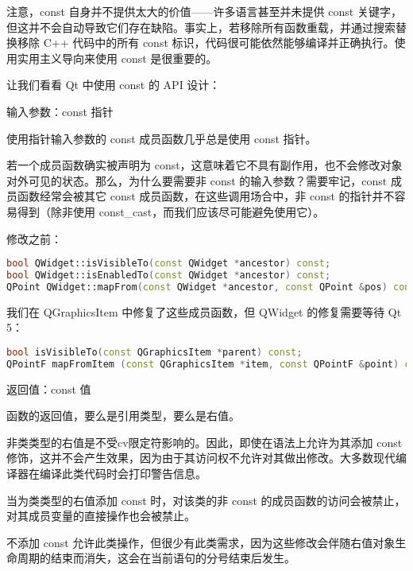 注意，const 自身并不提供太大的价值——许多语言甚至并未提供 const 关键字，但这并不会自动导致它们存在缺陷。事实上，若移除所有函数重载，并通过搜索替换移除 C++ 代码中的所有 const 标识，代码很可能依然能够编译并正确执行。使用实用主义导向来使用 const 是很重要的。

让我们看看 Qt 中使用 const 的 API 设计：

输入参数：const 指针

使用指针输入参数的 const 成员函数几乎总是使用 const 指针。

若一个成员函数确实被声明为 const，这意味着它不具有副作用，也不会修改对象对外可见的状态。那么，为什么要需要非 const 的输入参数？需要牢记，const 成员函数经常会被其它 const 成员函数，在这些调用场合中，非 const 的指针并不容易得到（除非使用 const\_cast，而我们应该尽可能避免使用它）。

修改之前：

\begin{lstlisting}[language=C++]
bool QWidget::isVisibleTo(const QWidget *ancestor) const;
bool QWidget::isEnabledTo(const QWidget *ancestor) const;
QPoint QWidget::mapFrom(const QWidget *ancestor, const QPoint &pos) const;
\end{lstlisting}


\begin{notice}
我们在 QGraphicsItem 中修复了这些成员函数，但 QWidget 的修复需要等待 Qt 5：
\end{notice}


\begin{lstlisting}[language=C++]
bool isVisibleTo(const QGraphicsItem *parent) const;
QPointF mapFromItem (const QGraphicsItem *item, const QPointF &point) const; 
\end{lstlisting}

返回值：const 值

函数的返回值，要么是引用类型，要么是右值。

非类类型的右值是不受cv限定符影响的。因此，即使在语法上允许为其添加 const 修饰，这并不会产生效果，因为由于其访问权不允许对其做出修改。大多数现代编译器在编译此类代码时会打印警告信息。

当为类类型的右值添加 const 时，对该类的非 const 的成员函数的访问会被禁止，对其成员变量的直接操作也会被禁止。

不添加 const 允许此类操作，但很少有此类需求，因为这些修改会伴随右值对象生命周期的结束而消失，这会在当前语句的分号结束后发生。

